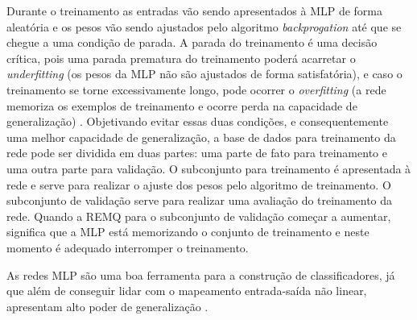 Durante o treinamento as entradas vão sendo apresentados à MLP de forma aleatória e os pesos vão sendo ajustados pelo algoritmo \textit{backprogation} até que se chegue a uma condição de parada. A parada do treinamento é uma decisão crítica, pois uma parada prematura do treinamento poderá acarretar o \textit{underfitting} (os pesos da MLP não são ajustados de forma satisfatória), e caso o treinamento se torne excessivamente longo, pode ocorrer o \textit{overfitting} (a rede memoriza os exemplos de treinamento e ocorre perda na capacidade de generalização) \cite{valenca1995fundamentos}. Objetivando evitar essas duas condições, e consequentemente uma melhor capacidade de generalização, a base de dados para treinamento da rede pode ser dividida em duas partes: uma parte de fato para treinamento e uma outra parte para validação. O subconjunto para treinamento é apresentada à rede e serve para realizar o ajuste dos pesos pelo algoritmo de treinamento. O subconjunto de validação serve para realizar uma avaliação do treinamento da rede. Quando a REMQ para o subconjunto de validação começar a aumentar, significa que a MLP está memorizando o conjunto de treinamento e neste momento é adequado interromper o treinamento.

As redes MLP são uma boa ferramenta para a construção de classificadores, já que além de conseguir lidar com o mapeamento entrada-saída não linear, apresentam alto poder de generalização \cite{haykin-1994}.


